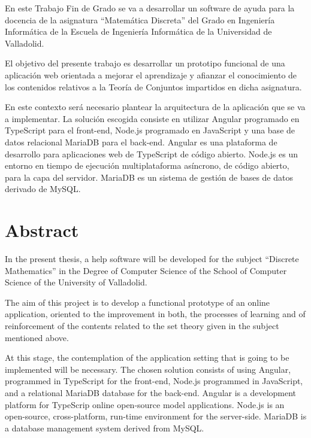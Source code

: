 \documentclass[openright,twoside,10pt]{book}
\begin{document}
    En este Trabajo Fin de Grado se va a desarrollar un software de ayuda
    para la docencia de la asignatura ``Matemática Discreta'' del Grado en
    Ingeniería Informática de la Escuela de Ingeniería Informática de la
    Universidad de Valladolid.
    
    El objetivo del presente trabajo es desarrollar un prototipo funcional
    de una aplicación web orientada a mejorar el aprendizaje y afianzar el
    conocimiento de los contenidos relativos a la Teoría de Conjuntos
    impartidos en dicha asignatura.
    
    En este contexto será necesario plantear la arquitectura de la
    aplicación que se va a implementar. La solución escogida consiste en
    utilizar Angular programado en TypeScript para el front-end, Node.js
    programado en JavaScript y una base de datos relacional MariaDB para el
    back-end. Angular es una plataforma de desarrollo para aplicaciones web
    de TypeScript de código abierto. Node.js es un entorno en tiempo de
    ejecución multiplataforma asíncrono, de código abierto, para la capa del
    servidor. MariaDB es un sistema de gestión de bases de datos derivado de
    MySQL.



    \chapter*{Abstract} %
  
    In the present thesis, a help software will be developed for the subject
    ``Discrete Mathematics'' in the Degree of Computer Science of the School
    of Computer Science of the University of Valladolid.
    
    The aim of this project is to develop a functional prototype of an
    online application, oriented to the improvement in both, the processes
    of learning and of reinforcement of the contents related to the set
    theory given in the subject mentioned above.
    
    At this stage, the contemplation of the application setting that is
    going to be implemented will be necessary. The chosen solution consists
    of using Angular, programmed in TypeScript for the front-end, Node.js
    programmed in JavaScript, and a relational MariaDB database for the
    back-end. Angular is a development platform for TypeScrip online
    open-source model applications. Node.js is an open-source,
    cross-platform, run-time environment for the server-side. MariaDB is a
    database management system derived from MySQL.
\end{document}
